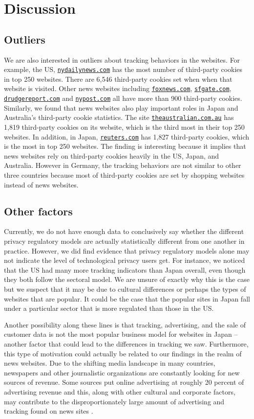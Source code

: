\documentclass[conference]{IEEEtran}
\begin{document}
\let\oldurl=\url
\def\url#1{\texttt{\oldurl{#1}}}

\section{Discussion}

\subsection{Outliers}
We are also interested in outliers about tracking behaviors in the websites. For example,  the US, \url{nydailynews.com} has the most number of third-party cookies in top 250 websites. There are 6,546 third-party cookies set when when that website is visited. Other news websites including \url{foxnews.com}, \url{sfgate.com}, \url{drudgereport.com} and \url{nypost.com} all have more than 900 third-party cookies. Similarly, we found that news websites also play important roles in Japan and Australia's third-party cookie statistics. The site \url{theaustralian.com.au} has 1,819 third-party cookies on its website, which is the third most in their top 250 websites. In addition, in Japan, \url{reuters.com} has 1,827 third-party cookies, which is the most in top 250 websites. The finding is interesting because it implies that news websites rely on third-party cookies heavily in the US, Japan, and Australia. However in Germany, the tracking behaviors are not similar to other three countries because most of third-party cookies are set by shopping websites instead of news websites.  

\subsection{Other factors}
Currently, we do not have enough data to conclusively say whether the different privacy regulatory models are actually statistically different from one another in practice.  However, we did find evidence that privacy regulatory models alone may not indicate the level of technological privacy users get. For instance, we noticed that the US had many more tracking indicators than Japan overall, even though they both follow the sectoral model. We are unsure of exactly why this is the case but we suspect that it may be due to cultural differences or perhaps the types of websites that are popular. It could be the case that the popular sites in Japan fall under a particular sector that is more regulated than those in the US. 

Another possibility along these lines is that tracking, advertising, and the sale of customer data is not the most popular business model for websites in Japan -- another factor that could lead to the differences in tracking we saw. Furthermore, this type of motivation could actually be related to our findings in the realm of news websites. Due to the shifting media landscape in many countries, newspapers and other journalistic organizations are constantly looking for new sources of revenue. Some sources put online advertising at roughly 20 percent of advertising revenue and this, along with other cultural and corporate factors, may contribute to the disproportionately large amount of advertising and tracking found on news sites \cite{economist}.
\end{document}
